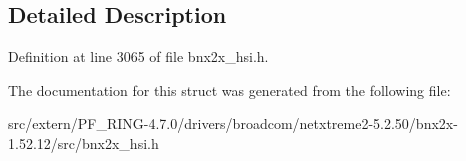 \subsection{Detailed Description}


Definition at line 3065 of file bnx2x\_\-hsi.h.



The documentation for this struct was generated from the following file:\begin{DoxyCompactItemize}
\item 
src/extern/PF\_\-RING-\/4.7.0/drivers/broadcom/netxtreme2-\/5.2.50/bnx2x-\/1.52.12/src/bnx2x\_\-hsi.h\end{DoxyCompactItemize}
